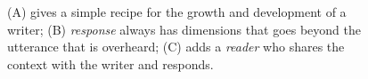 \begin{figure}
\resizebox{\columnwidth}{!}{%

}

\caption{(A) gives a simple recipe for the growth and
development of a writer;
(B) \emph{response} always has dimensions that goes beyond the
utterance that is overheard;
(C) adds a \emph{reader} who shares the context with the writer and responds.%
\label{fig:cycles}}
\end{figure}
